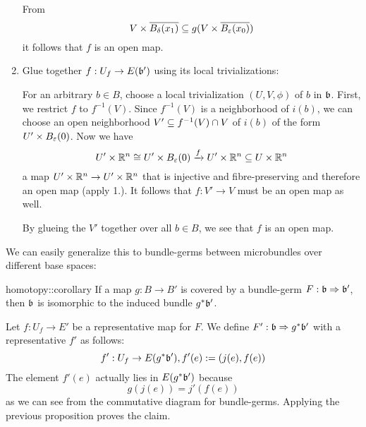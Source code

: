 \begin{myproof}
\begin{enumerate}
        From
        \[ V \times \clball[\delta][x_1] \sub g(V \times \clball[\varepsilon][x_0]) \]
        it follows that $f$ is an open map.

        \item Glue together $f: U_f \to E(\mathfrak{b}')$ using its local trivializations:

        For an arbitrary $b \in B$, choose a local trivialization $(U, V, \phi)$ of $b$ in $\mathfrak{b}$.
        First, we restrict $f$ to $f^{-1}(V)$.
        Since $f^{-1}(V)$ is a neighborhood of $i(b)$, we can choose an open neighborhood $V' \subseteq{} f^{-1}(V) \cap V$ of $i(b)$ of the form $U' \times \ball[\varepsilon]$.
        Now we have
        \[ U' \times \R^n \cong U' \times \ball[\varepsilon] \xto{f} U' \times \R^n \sub U \times \R^n \]
        a map $U' \times \mathbb{R}^n \to U' \times \mathbb{R}^n$ that is injective and fibre-preserving and therefore an open map (apply 1.).
        It follows that $f: V' \to V$ must be an open map as well.

        By glueing the $V'$ together over all $b \in B$, we see that $f$ is an open map.
    \end{enumerate}
\end{myproof}

\begin{myparagraph}
    We can easily generalize this to bundle-germs between microbundles over different base spaces:
\end{myparagraph}

\begin{mycorollary}{homotopy::corollary}
    If a map $g: B \to B'$ is covered by a bundle-germ $F: \mathfrak{b} \Rightarrow{} \mathfrak{b}'$, then $\mathfrak{b}$ is isomorphic to the induced bundle $g^*\mathfrak{b}'$.
\end{mycorollary}
\begin{myproof}
    Let $f: U_f \to E'$ be a representative map for $F$.
    We define $F': \mathfrak{b} \Rightarrow{} g^*\mathfrak{b}'$ with a representative $f'$ as follows:
    \[ f': U_f \to E(g^*\mathfrak{b}'), f'(e) := (j(e), f(e)) \]
    The element $f'(e)$ actually lies in $E(g^*\mathfrak{b}')$ because
    \[ g(j(e)) = j'(f(e)) \]
    as we can see from the commutative diagram for bundle-germs.
    Applying the previous proposition proves the claim.
\end{myproof}